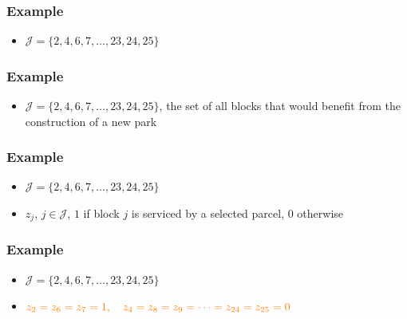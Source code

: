 \documentclass[10pt, compress]{beamer}
\begin{document}
\begin{frame}[fragile]
  \frametitle{Example}
  \begin{center}
\end{center}
\begin{itemize}
\item $\mathcal{J} = \{2,4,6,7, \dots, 23,24,25\}$
\end{itemize}
\end{frame}

\begin{frame}[fragile]
  \frametitle{Example}
  \begin{center}
\end{center}
\begin{itemize}
\item $\mathcal{J} = \{2,4,6,7, \dots, 23,24,25\}$, the set of all blocks that would benefit from the construction of a new park
\end{itemize}
\end{frame}

\begin{frame}[fragile]
  \frametitle{Example}
  \begin{center}
\end{center}
\begin{itemize}
\item $\mathcal{J} = \{2,4,6,7, \dots, 23,24,25\}$
\item $z_j$, \; $j \in \mathcal{J}$, $1$ if block $j$ is serviced by a selected parcel, 0 otherwise
\end{itemize}
\end{frame}

\begin{frame}[fragile]
  \frametitle{Example}
  \begin{center}
\end{center}
\begin{itemize}
\item $\mathcal{J} = \{2,4,6,7, \dots, 23,24,25\}$
\item $\color{orange} z_2 = z_6 = z_7 = 1, \quad z_4 = z_8 = z_9 = \dots = z_{24} = z_{25} = 0$
\end{itemize}
\end{frame}
\end{document}
